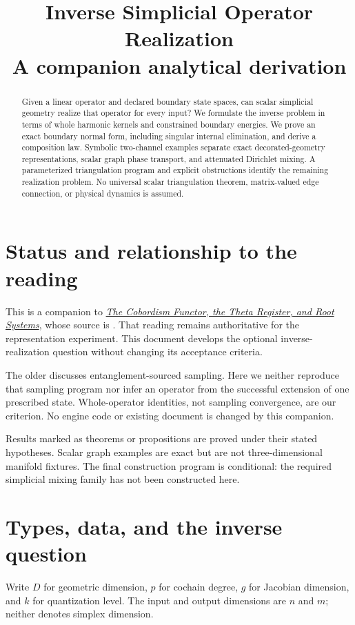 \documentclass[11pt]{article}
\title{Inverse Simplicial Operator Realization\\[4pt]
\large A companion analytical derivation}
\author{}
\date{}
\theoremstyle{definition}
\begin{document}
\maketitle
\begin{abstract}
Given a linear operator and declared boundary state spaces, can scalar
simplicial geometry realize that operator for every input? We formulate
the inverse problem in terms of whole harmonic kernels and constrained
boundary energies. We prove an exact boundary normal form, including
singular internal elimination, and derive a composition law. Symbolic
two-channel examples separate exact decorated-geometry representations,
scalar graph phase transport, and attenuated Dirichlet mixing. A
parameterized triangulation program and explicit obstructions identify
the remaining realization problem. No universal scalar triangulation
theorem, matrix-valued edge connection, or physical dynamics is assumed.
\end{abstract}

\section*{Status and relationship to the reading}
This is a companion to
\href{cobordism_functor_reading.pdf}{\emph{The Cobordism Functor, the Theta
Register, and Root Systems}}, whose source is
 \cite{reading}.
That reading remains authoritative for the representation experiment.
This document develops the optional inverse-realization question without
changing its acceptance criteria.

The older  discusses entanglement-sourced
sampling. Here we neither reproduce that sampling program nor infer an
operator from the successful extension of one prescribed state.
Whole-operator identities, not sampling convergence, are our criterion.
No engine code or existing document is changed by this companion.

Results marked as theorems or propositions are proved under their stated
hypotheses. Scalar graph examples are exact but are not three-dimensional
manifold fixtures. The final construction program is conditional:
the required simplicial mixing family has not been constructed here.
\clearpage
\tableofcontents
\clearpage

\section{Types, data, and the inverse question}\label{sec:types}
Write $D$ for geometric dimension, $p$ for cochain degree, $g$ for Jacobian
dimension, and $k$ for quantization level. The input and output dimensions
are $n$ and $m$; neither denotes simplex dimension.
\end{document}
